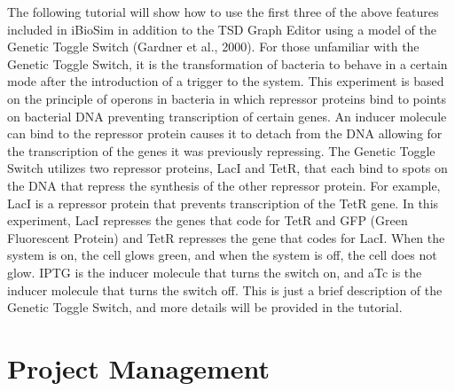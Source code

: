 \documentclass[titlepage,11pt]{article}
\begin{document}
The following tutorial will show how to use the first three of the above features included in iBioSim in addition to the TSD Graph Editor using a model of the Genetic Toggle Switch (Gardner et al., 2000). For those unfamiliar with the Genetic Toggle Switch, it is the transformation of bacteria to behave in a certain mode after the introduction of a trigger to the system. This experiment is based on the principle of operons in bacteria in which repressor proteins bind to points on bacterial DNA preventing transcription of certain genes. An inducer molecule can bind to the repressor protein causes it to detach from the DNA allowing for the transcription of the genes it was previously repressing. The Genetic Toggle Switch utilizes two repressor proteins, LacI and TetR, that each bind to spots on the DNA that repress the synthesis of the other repressor protein. For example, LacI is a repressor protein that prevents transcription of the TetR gene. In this experiment, LacI represses the genes that code for TetR and GFP (Green Fluorescent Protein) and TetR represses the gene that codes for LacI. When the system is on, the cell glows green, and when the system is off, the cell does not glow. IPTG is the inducer molecule that turns the switch on, and aTc is the inducer molecule that turns the switch off. This is just a brief description of the Genetic Toggle Switch, and more details will be provided in the tutorial.



\section{Project Management}
\end{document}
